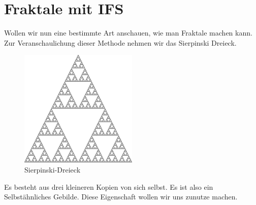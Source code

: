 %
%
%
\section{Fraktale mit IFS 
\label{ifs:section:teil2}}
Wollen wir nun eine bestimmte Art anschauen, wie man Fraktale machen kann.
Zur Veranschaulichung dieser Methode nehmen wir das Sierpinski Dreieck.
\begin{figure}
	\centering
	\includegraphics[width=0.5\textwidth]{papers/ifs/images/sierpinski}
	\caption{Sierpinski-Dreieck}
	\label{ifs:sierpinski10}
\end{figure}
Es besteht aus drei kleineren Kopien von sich selbst.
Es ist also ein Selbstähnliches Gebilde.
Diese Eigenschaft wollen wir uns zunutze machen.


